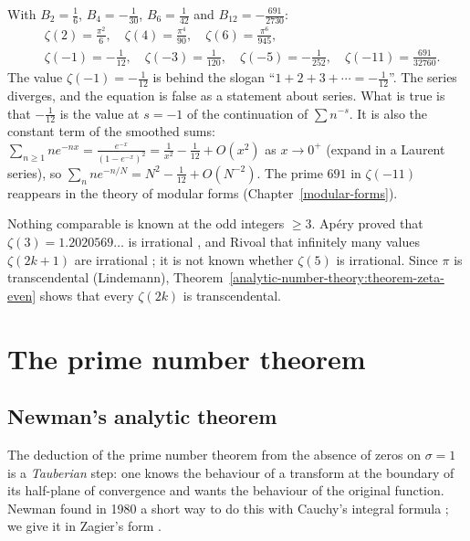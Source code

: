 \begin{example}\label{analytic-number-theory:example-zeta-values}
With $B_2 = \frac16$, $B_4 = -\frac1{30}$, $B_6 = \frac1{42}$ and $B_{12} = -\frac{691}{2730}$:
\[
\begin{aligned}
&\zeta(2) = \frac{\pi^2}{6}, \quad \zeta(4) = \frac{\pi^4}{90}, \quad \zeta(6) = \frac{\pi^6}{945}, \\
&\zeta(-1) = -\frac1{12}, \quad \zeta(-3) = \frac1{120}, \quad \zeta(-5) = -\frac1{252}, \quad \zeta(-11) = \frac{691}{32760}.
\end{aligned}
\]
The value $\zeta(-1) = -\frac1{12}$ is behind the slogan ``$1 + 2 + 3 + \cdots = -\frac1{12}$''. The series diverges, and the equation is false as a statement about series. What is true is that
$-\frac1{12}$ is the value at $s = -1$ of the continuation of $\sum n^{-s}$. It is also the constant term of the smoothed sums: $\sum_{n \geq 1}ne^{-nx} = \frac{e^{-x}}{(1 - e^{-x})^2} = \frac{1}{x^2} - \frac1{12} + O(x^2)$
as $x \to 0^+$ (expand in a Laurent series), so $\sum_nne^{-n/N} = N^2 - \frac1{12} + O(N^{-2})$. The prime $691$ in $\zeta(-11)$ reappears in the theory of modular forms (Chapter~\ref{modular-forms}).
\end{example}

\begin{remark}\label{analytic-number-theory:remark-zeta-odd}
Nothing comparable is known at the odd integers $\geq 3$. Ap\'ery proved that $\zeta(3) = 1.2020569\ldots$ is irrational \cite{apery-1979}, and Rivoal that infinitely many values $\zeta(2k + 1)$ are
irrational \cite{rivoal-2000}; it is not known whether $\zeta(5)$ is irrational. Since $\pi$ is transcendental (Lindemann), Theorem~\ref{analytic-number-theory:theorem-zeta-even} shows that every
$\zeta(2k)$ is transcendental.
\end{remark}

\section{The prime number theorem}\label{analytic-number-theory:section-pnt}

\subsection{Newman's analytic theorem}\label{analytic-number-theory:subsection-newman}

The deduction of the prime number theorem from the absence of zeros on $\sigma = 1$ is a \emph{Tauberian} step: one knows the behaviour of a transform at the boundary of its half-plane of
convergence and wants the behaviour of the original function. Newman found in 1980 a short way to do this with Cauchy's integral formula \cite{newman-1980}; we give it in Zagier's form
\cite{zagier-newman}.

